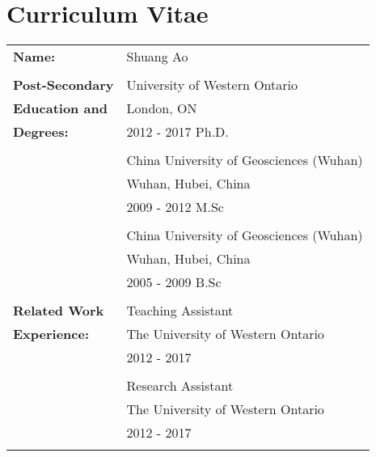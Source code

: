 \documentclass[12pt,twoside]{report}
\numberwithin{figure}{chapter}
\newcommand{\firstname}{Shuang}
\newcommand{\lastname}{Ao}
\begin{document}
	\begin{appendices}
		
	\end{appendices}
	
	\chapter*{Curriculum Vitae}
	\begin{table}[ht]
		\begin{tabular}{ll}
			\textbf{Name:} & \firstname{} \lastname\\\\
			\textbf{Post-Secondary} &  University of Western Ontario\\
			\textbf{Education and}& London, ON\\
			\textbf{Degrees:}& 2012 - 2017 Ph.D.\\\\
			& China University of Geosciences (Wuhan)\\
			& Wuhan, Hubei, China\\
			& 2009 - 2012 M.Sc\\\\
			& China University of Geosciences (Wuhan)\\
			& Wuhan, Hubei, China\\
			& 2005 - 2009 B.Sc\\\\
			\textbf{Related Work}& Teaching Assistant\\
			\textbf{Experience:}& The University of Western Ontario\\
			& 2012 - 2017\\\\
			
			& Research Assistant\\
			& The University of Western Ontario\\
			& 2012 - 2017\\\\
		\end{tabular}
	\end{table}
\end{document}
